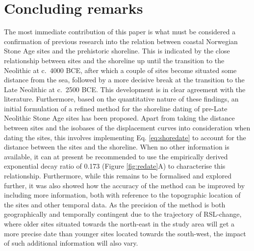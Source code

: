 \documentclass[
]{article}
\begin{document}
\hypertarget{concluding-remarks}{%
\section{Concluding remarks}\label{concluding-remarks}}

The most immediate contribution of this paper is what must be considered a confirmation of previous research into the relation between coastal Norwegian Stone Age sites and the prehistoric shoreline. This is indicated by the close relationship between sites and the shoreline up until the transition to the Neolithic at c.~4000 BCE, after which a couple of sites become situated some distance from the sea, followed by a more decisive break at the transition to the Late Neolithic at c.~2500 BCE. This development is in clear agreement with the literature. Furthermore, based on the quantitative nature of these findings, an initial formulation of a refined method for the shoreline dating of pre-Late Neolithic Stone Age sites has been proposed. Apart from taking the distance between sites and the isobases of the displacement curves into consideration when dating the sites, this involves implementing Eq. \eqref{eq:shoredate} to account for the distance between the sites and the shoreline. When no other information is available, it can at present be recommended to use the empirically derived exponential decay ratio of 0.173 (Figure \ref{fig:redate}A) to characterise this relationship. Furthermore, while this remains to be formalised and explored further, it was also showed how the accuracy of the method can be improved by including more information, both with reference to the topographic location of the sites and other temporal data. As the precision of the method is both geographically and temporally contingent due to the trajectory of RSL-change, where older sites situated towards the north-east in the study area will get a more precise date than younger sites located towards the south-west, the impact of such additional information will also vary.
\end{document}
